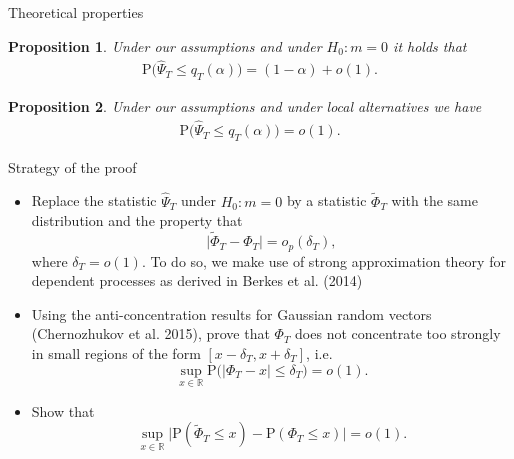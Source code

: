 \documentclass[10pt, handout]{beamer}
\newcommand{\Prob}{\mathrm{P}}
\newtheorem{prop}{Proposition}
\begin{document}
\begin{frame}{Theoretical properties}

\begin{prop}\label{prop-test-1}
Under our assumptions and under $H_0: m= 0$ it holds that 
\begin{align*}
\Prob \big( \widehat{\Psi}_T \le q_T(\alpha) \big) = (1 - \alpha) + o(1).
\end{align*}
\end{prop}\pause
\vspace{5mm}
\begin{prop}\label{prop-test-2}
Under our assumptions and under local alternatives we have 
\begin{align*}
\Prob \big( \widehat{\Psi}_T \le q_T(\alpha) \big) = o(1).
\end{align*}
\end{prop}
\end{frame}

\begin{frame}{Strategy of the proof}
\begin{itemize}
\item Replace the statistic $\widehat{\Psi}_T$ under $H_0: m = 0$ by a statistic $\widetilde{\Phi}_T$ with the same distribution and the property that 
\begin{equation*}\label{eq-theo-stat-strategy-step1}
\big| \widetilde{\Phi}_T - \Phi_T \big| = o_p(\delta_T),
\end{equation*}
where $\delta_T = o(1)$. To do so, we make use of strong approximation theory for dependent processes as derived in Berkes et al. (2014)\pause
\vspace{2mm}
\item Using the anti-concentration results for Gaussian random vectors (Chernozhukov et al. 2015), prove that $\Phi_T$ does not concentrate too strongly in small regions of the form $[x-\delta_T,x+\delta_T]$, i.e.
\begin{equation*}\label{eq-theo-stat-strategy-step2}
\sup_{x \in \mathbb{R}} \Prob \big( |\Phi_T - x| \le \delta_T \big) = o(1).
\end{equation*}\pause
\vspace{-2mm}
\item Show that 
\begin{equation*}\label{eq-theo-stat-strategy-claim}
\sup_{x \in \mathbb{R}} \big| \Prob(\widetilde{\Phi}_T \le x) - \Prob(\Phi_T \le x) \big| = o(1). 
\end{equation*}
\end{itemize}
\end{frame}
\end{document}
